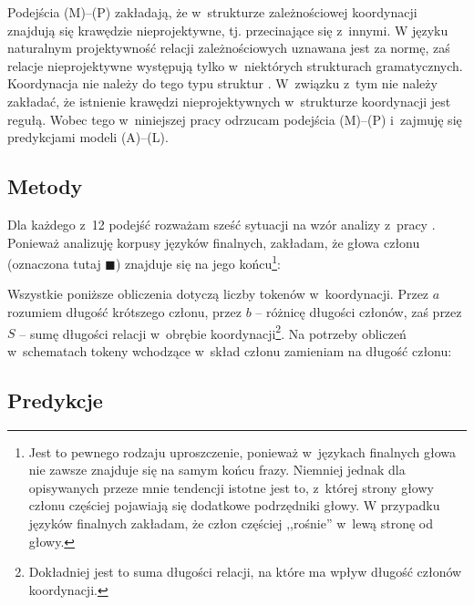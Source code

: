 Podejścia (M)--(P) zakładają, że w~strukturze zależnościowej koordynacji znajdują się krawędzie nieprojektywne, tj. przecinające się z~innymi. W języku naturalnym projektywność relacji zależnościowych uznawana jest za normę, zaś relacje nieprojektywne występują tylko w~niektórych strukturach gramatycznych. Koordynacja nie należy do tego typu struktur \citep{nivre2006constraints}. W~związku z~tym nie należy zakładać, że istnienie krawędzi nieprojektywnych w~strukturze koordynacji jest regułą. Wobec tego w~niniejszej pracy odrzucam podejścia (M)--(P) i~zajmuję się predykcjami modeli (A)--(L).

\subsection{Metody}

Dla każdego z~12 podejść rozważam sześć sytuacji na wzór analizy z~pracy \cite{przepiorkowski2023conjunct}. Ponieważ analizuję korpusy języków finalnych, zakładam, że głowa członu (oznaczona tutaj $\blacksquare$) znajduje się na jego końcu\footnote{
Jest to pewnego rodzaju uproszczenie, ponieważ w~językach finalnych głowa nie zawsze znajduje się na samym końcu frazy. Niemniej jednak dla opisywanych przeze mnie tendencji istotne jest to, z~której strony głowy członu częściej pojawiają się dodatkowe podrzędniki głowy. W przypadku języków finalnych zakładam, że człon częściej ,,rośnie'' w~lewą stronę od głowy.}:



Wszystkie poniższe obliczenia dotyczą liczby tokenów w~koordynacji. Przez $a$ rozumiem długość krótszego członu, przez $b$ -- różnicę długości członów, zaś przez $S$ -- sumę długości relacji w~obrębie koordynacji\footnote{Dokładniej jest to suma długości relacji, na które ma wpływ długość członów koordynacji.}. Na potrzeby obliczeń w~schematach tokeny wchodzące w~skład członu zamieniam na długość członu:



\subsection{Predykcje}















